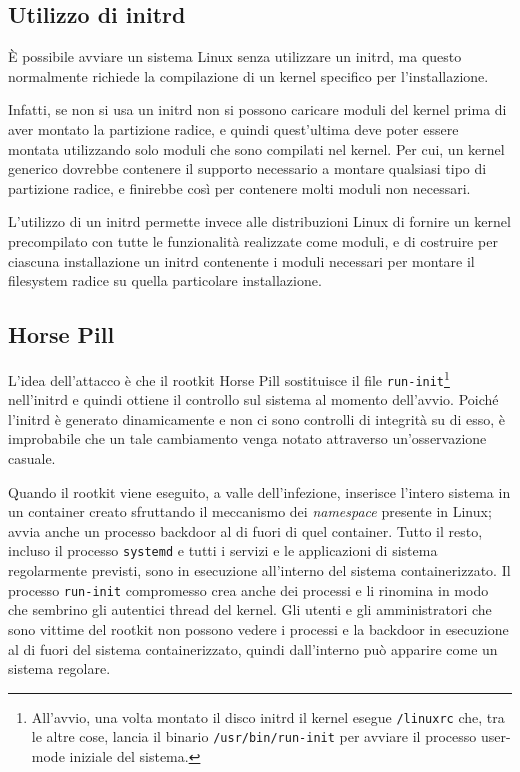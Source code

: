 \documentclass{article}
\begin{document}
\subsection{Utilizzo di initrd}
È possibile avviare un sistema Linux senza utilizzare un initrd, ma questo normalmente richiede la compilazione di un kernel specifico per l'installazione.

Infatti, se non si usa un initrd non si possono caricare moduli del kernel prima di aver montato la partizione radice, e quindi quest'ultima deve poter essere montata utilizzando solo moduli che sono compilati nel kernel. Per cui, un kernel generico dovrebbe contenere il supporto necessario a montare qualsiasi tipo di partizione radice, e finirebbe così per contenere molti moduli non necessari.

L'utilizzo di un initrd permette invece alle distribuzioni Linux di fornire un kernel precompilato con tutte le funzionalità realizzate come moduli, e di costruire per ciascuna installazione un initrd contenente i moduli necessari per montare il filesystem radice su quella particolare installazione.

\subsection{Horse Pill}
L'idea dell'attacco è che il rootkit Horse Pill sostituisce il file \texttt{run-init}\footnote{All'avvio, una volta montato il disco initrd il kernel esegue \texttt{/linuxrc} che, tra le altre cose, lancia il binario \texttt{/usr/bin/run-init} per avviare il processo user-mode iniziale del sistema.} nell'initrd e quindi ottiene il controllo sul sistema al momento dell'avvio. Poiché l'initrd è generato dinamicamente e non ci sono controlli di integrità su di esso, è improbabile che un tale cambiamento venga notato attraverso un'osservazione casuale.

Quando il rootkit viene eseguito, a valle dell'infezione, inserisce l'intero sistema in un container creato sfruttando il meccanismo dei \textsl{namespace} presente in Linux; avvia anche un processo backdoor al di fuori di quel container. Tutto il resto, incluso il processo \texttt{systemd} e tutti i servizi e le applicazioni di sistema regolarmente previsti, sono in esecuzione all'interno del sistema containerizzato. Il processo \texttt{run-init} compromesso crea anche dei processi e li rinomina in modo che sembrino gli autentici thread del kernel. Gli utenti e gli amministratori che sono vittime del rootkit non possono vedere i processi e la backdoor in esecuzione al di fuori del sistema containerizzato, quindi dall'interno può apparire come un sistema regolare.
\end{document}
